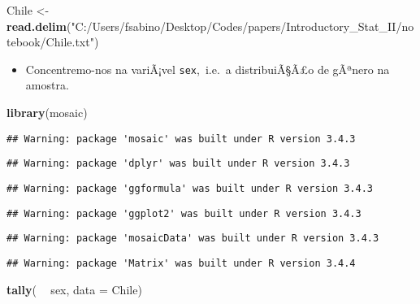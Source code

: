 \documentclass[]{article}
\newenvironment{Shaded}{\begin{snugshade}}{\end{snugshade}}
\newcommand{\KeywordTok}[1]{\textcolor[rgb]{0.13,0.29,0.53}{\textbf{#1}}}
\newcommand{\DataTypeTok}[1]{\textcolor[rgb]{0.13,0.29,0.53}{#1}}
\newcommand{\StringTok}[1]{\textcolor[rgb]{0.31,0.60,0.02}{#1}}
\newcommand{\OperatorTok}[1]{\textcolor[rgb]{0.81,0.36,0.00}{\textbf{#1}}}
\newcommand{\NormalTok}[1]{#1}
\providecommand{\tightlist}{%
  \setlength{\itemsep}{0pt}\setlength{\parskip}{0pt}}
\begin{document}
\begin{Shaded}
\begin{Highlighting}[]
\NormalTok{Chile <-}\StringTok{ }\KeywordTok{read.delim}\NormalTok{(}\StringTok{"C:/Users/fsabino/Desktop/Codes/papers/Introductory_Stat_II/notebook/Chile.txt"}\NormalTok{)}
\end{Highlighting}
\end{Shaded}

\begin{itemize}
\tightlist
\item
  Concentremo-nos na variÃ¡vel \texttt{sex},~i.e.~a distribuiÃ§Ã£o de
  gÃªnero na amostra.
\end{itemize}

\begin{Shaded}
\begin{Highlighting}[]
\KeywordTok{library}\NormalTok{(mosaic)}
\end{Highlighting}
\end{Shaded}

\begin{verbatim}
## Warning: package 'mosaic' was built under R version 3.4.3
\end{verbatim}

\begin{verbatim}
## Warning: package 'dplyr' was built under R version 3.4.3
\end{verbatim}

\begin{verbatim}
## Warning: package 'ggformula' was built under R version 3.4.3
\end{verbatim}

\begin{verbatim}
## Warning: package 'ggplot2' was built under R version 3.4.3
\end{verbatim}

\begin{verbatim}
## Warning: package 'mosaicData' was built under R version 3.4.3
\end{verbatim}

\begin{verbatim}
## Warning: package 'Matrix' was built under R version 3.4.4
\end{verbatim}

\begin{Shaded}
\begin{Highlighting}[]
\KeywordTok{tally}\NormalTok{( }\OperatorTok{~}\StringTok{ }\NormalTok{sex, }\DataTypeTok{data =}\NormalTok{ Chile)}
\end{Highlighting}
\end{Shaded}
\end{document}

